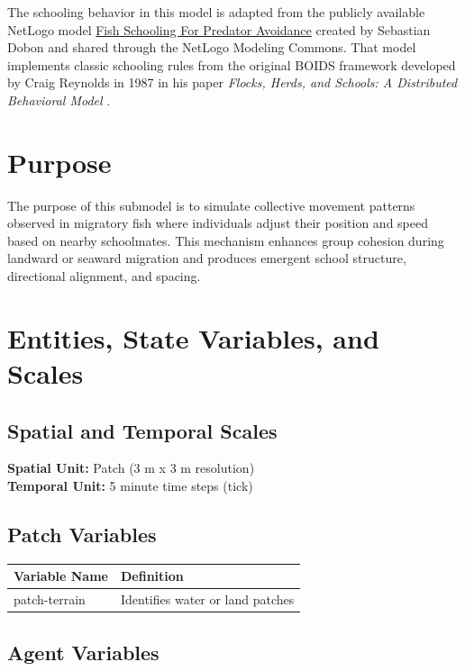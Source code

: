 \documentclass[
]{book}
\begin{document}
The schooling behavior in this model is adapted from the publicly available NetLogo model \href{https://modelingcommons.org/browse/one_model/5709\#model_tabs_browse_info}{Fish Schooling For Predator Avoidance} created by Sebastian Dobon and shared through the NetLogo Modeling Commons. That model implements classic schooling rules from the original BOIDS framework developed by Craig Reynolds in 1987 in his paper \emph{Flocks, Herds, and Schools: A Distributed Behavioral Model} \citep{reynolds_flocks_1987}.

\section{Purpose}\label{purpose-8}

The purpose of this submodel is to simulate collective movement patterns observed in migratory fish where individuals adjust their position and speed based on nearby schoolmates. This mechanism enhances group cohesion during landward or seaward migration and produces emergent school structure, directional alignment, and spacing.

\section{Entities, State Variables, and Scales}\label{entities-state-variables-and-scales-9}

\subsection{Spatial and Temporal Scales}\label{spatial-and-temporal-scales-9}

\textbf{Spatial Unit:} Patch (3 m x 3 m resolution)\\
\textbf{Temporal Unit:} 5 minute time steps (tick)

\subsection{Patch Variables}\label{patch-variables-9}

\begin{longtable}[]{@{}ll@{}}
\toprule\noalign{}
Variable Name & Definition \\
\midrule\noalign{}
\endhead
\bottomrule\noalign{}
\endlastfoot
patch-terrain & Identifies water or land patches \\
\end{longtable}

\subsection{Agent Variables}\label{agent-variables-9}
\end{document}
